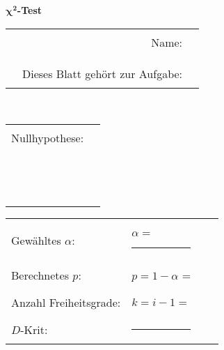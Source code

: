 \documentclass[10pt,a4paper,fleqn]{article}
\begin{document}
	\pagestyle{empty}
	\huge{\textbf{$\mathbf{\chi^{2}}$-Test}}\\[10pt]
	\normalsize
	\begin{tabularx}{\textwidth}{Xrp{180pt}}
		& \Large{Name: } & \hrule \\
		&&\\
		& Dieses Blatt gehört zur Aufgabe: & \hrule \\
	\end{tabularx}
	\\[20pt]
	
	\renewcommand{\arraystretch}{1.2}
	\begin{tabularx}{\textwidth}{p{70pt}X}
		\large{Nullhypothese:} & \hrule\\
		& \hrule\\
		& \hrule\\
	\end{tabularx}
	
	\begin{tabularx}{\textwidth}{l p{50pt} X X}
		\large{Gewähltes $\alpha$:} & $\alpha = $\hrule & \hrule \\
		Berechnetes $p$:& $p = 1 - \alpha$ = & \hrule\\
		\large{Anzahl Freiheitsgrade:} & $k = i - 1 =$ & \hrule \\
		\large{$D$-Krit:} & \hrule &\hrule \\
	\end{tabularx}
	
\end{document}
